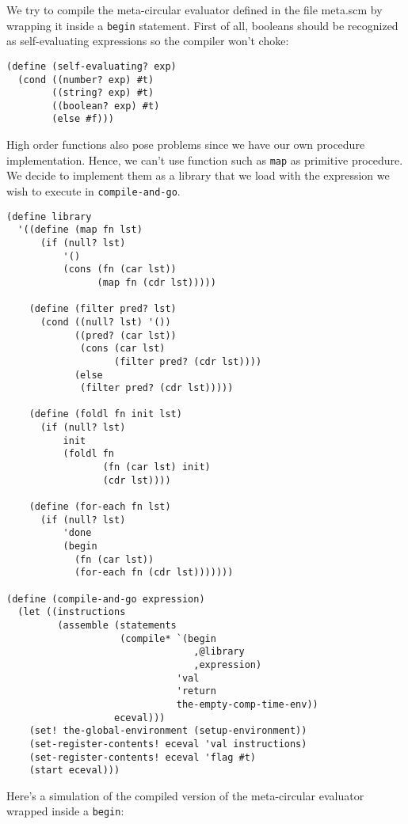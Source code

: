 \documentclass[a4paper,12pt]{article}
\begin{document}
We try to compile the meta-circular evaluator defined in the file
meta.scm by wrapping it inside a \lstinline!begin! statement.  First
of all, booleans should be recognized  as self-evaluating expressions
so the compiler won't choke:
\begin{lstlisting}
(define (self-evaluating? exp)
  (cond ((number? exp) #t)
        ((string? exp) #t)
        ((boolean? exp) #t)
        (else #f)))
\end{lstlisting}

High order functions also pose problems since we have our own
procedure implementation.  Hence, we can't use function such as
\lstinline!map! as primitive procedure.  We decide to implement them
as a library that we load with the expression we wish to execute in
\lstinline!compile-and-go!.

\begin{lstlisting}
(define library
  '((define (map fn lst)
      (if (null? lst)
          '()
          (cons (fn (car lst))
                (map fn (cdr lst)))))

    (define (filter pred? lst)
      (cond ((null? lst) '())
            ((pred? (car lst))
             (cons (car lst)
                   (filter pred? (cdr lst))))
            (else
             (filter pred? (cdr lst)))))

    (define (foldl fn init lst)
      (if (null? lst)
          init
          (foldl fn
                 (fn (car lst) init)
                 (cdr lst))))

    (define (for-each fn lst)
      (if (null? lst)
          'done
          (begin
            (fn (car lst))
            (for-each fn (cdr lst)))))))

(define (compile-and-go expression)
  (let ((instructions
         (assemble (statements
                    (compile* `(begin
                                 ,@library
                                 ,expression)
                              'val
                              'return
                              the-empty-comp-time-env))
                   eceval)))
    (set! the-global-environment (setup-environment))
    (set-register-contents! eceval 'val instructions)
    (set-register-contents! eceval 'flag #t)
    (start eceval)))
\end{lstlisting}

Here's a simulation of the compiled version of the meta-circular
evaluator wrapped inside a \lstinline!begin!:
\end{document}
